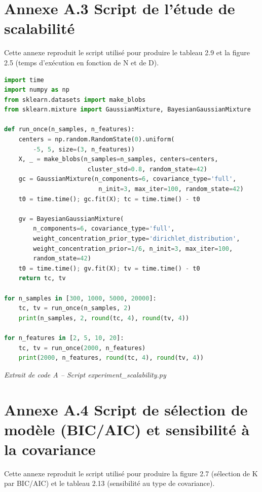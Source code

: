 \section*{Annexe A.3  Script de l'étude de scalabilité}
Cette annexe reproduit le script utilisé pour produire le tableau 2.9 et la figure 2.5 (temps d'exécution en fonction de N et de D).

\begin{lstlisting}[language=Python]
import time
import numpy as np
from sklearn.datasets import make_blobs
from sklearn.mixture import GaussianMixture, BayesianGaussianMixture

def run_once(n_samples, n_features):
    centers = np.random.RandomState(0).uniform(
        -5, 5, size=(3, n_features))
    X, _ = make_blobs(n_samples=n_samples, centers=centers,
                       cluster_std=0.8, random_state=42)
    gc = GaussianMixture(n_components=6, covariance_type='full',
                          n_init=3, max_iter=100, random_state=42)
    t0 = time.time(); gc.fit(X); tc = time.time() - t0

    gv = BayesianGaussianMixture(
        n_components=6, covariance_type='full',
        weight_concentration_prior_type='dirichlet_distribution',
        weight_concentration_prior=1/6, n_init=3, max_iter=100,
        random_state=42)
    t0 = time.time(); gv.fit(X); tv = time.time() - t0
    return tc, tv

for n_samples in [300, 1000, 5000, 20000]:
    tc, tv = run_once(n_samples, 2)
    print(n_samples, 2, round(tc, 4), round(tv, 4))

for n_features in [2, 5, 10, 20]:
    tc, tv = run_once(2000, n_features)
    print(2000, n_features, round(tc, 4), round(tv, 4))
\end{lstlisting}
\begin{center}\small\emph{Extrait de code A -- Script experiment\_scalability.py}\end{center}
\section*{Annexe A.4  Script de sélection de modèle (BIC/AIC) et sensibilité à la covariance}
Cette annexe reproduit le script utilisé pour produire la figure 2.7 (sélection de K par BIC/AIC) et le tableau 2.13 (sensibilité au type de covariance).

